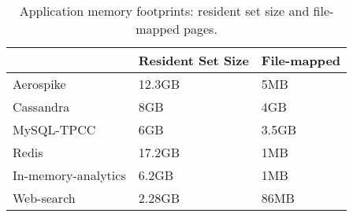\begin{table}[t]
\begin{center}
\begin{tabular}{|l|l|l|}
\hline
& Resident Set Size& File-mapped\\
\hline
Aerospike & 12.3GB & 5MB\\
\hline
Cassandra & 8GB & 4GB\\
\hline
MySQL-TPCC & 6GB & 3.5GB\\
\hline
Redis & 17.2GB & 1MB\\
\hline
In-memory-analytics & 6.2GB & 1MB\\
\hline
Web-search & 2.28GB & 86MB\\
\hline
\end{tabular}
\caption{Application memory footprints: resident set size and file-mapped pages.}
\label{tab:memory-footprint}
\end{center}
\end{table}
